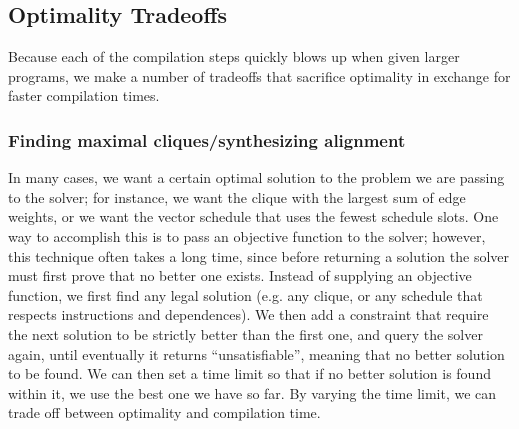 \subsection{Optimality Tradeoffs}\label{sec:optimality-tradeoffs}
Because each of the compilation steps quickly blows up when given larger programs, we make a number of tradeoffs that sacrifice optimality in exchange for faster compilation times.

\subsubsection*{Finding maximal cliques/synthesizing alignment}\label{sec:iterative-synthesis}
In many cases, we want a certain optimal solution to the problem we are passing to the solver; for instance, we want the clique with the largest sum of edge weights, or we want the vector schedule that uses the fewest schedule slots.
One way to accomplish this is to pass an objective function to the solver; however, this technique often takes a long time, since before returning a solution the solver must first prove that no better one exists.
Instead of supplying an objective function, we first find any legal solution (e.g. any clique, or any schedule that respects instructions and dependences).
We then add a constraint that require the next solution to be strictly better than the first one, and query the solver again, until eventually it returns ``unsatisfiable'', meaning that no better solution to be found.
We can then set a time limit so that if no better solution is found within it, we use the best one we have so far.
By varying the time limit, we can trade off between optimality and compilation time.

